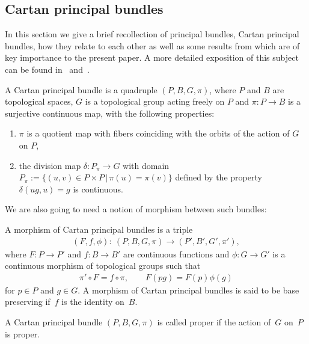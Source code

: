 \documentclass[pdftex]{sigma}
\begin{document}
\subsection{Cartan principal bundles}
In this section we give a brief recollection of principal bundles, Cartan principal bundles, how they relate to each other as well as some results from \cite{P} which are of key importance to the present paper. A more detailed exposition of this subject can be found in~\cite{McK1} and~\cite{P}.
\begin{defi} A Cartan principal bundle is a quadruple $(P,B,G,\pi)$, where $P$ and $B$ are topological spaces, $G$ is a topological group acting freely on $P$ and $\pi\colon P\rightarrow B$ is a surjective continuous map, with the following properties:
\begin{enumerate}\itemsep=0pt
\item[1)] $\pi$ is a quotient map with fibers coinciding with the orbits of the action of $G$ on $P$,
\item[2)] the division map $\delta\colon P_{\pi}\rightarrow G$ with domain $P_{\pi}:=\{(u,v)\in P\times P\, |\, \pi(u)=\pi(v)\}$ defined by the property $\delta(ug,u)=g$ is continuous.
\end{enumerate}
\end{defi}
We are also going to need a notion of morphism between such bundles:
\begin{defi}A morphism of Cartan principal bundles is a triple
\begin{gather*} (F,f,\phi)\colon \ (P,B,G,\pi)\rightarrow (P',B',G',\pi'),\end{gather*} where $F\colon P\rightarrow P'$ and $f\colon B\rightarrow B'$ are continuous functions and $\phi\colon G\rightarrow G'$ is a continuous morphism of topological groups such that
\begin{gather*}
\pi'\circ F=f\circ\pi, \qquad F(pg)=F(p)\phi(g)
\end{gather*}
for $p\in P$ and $g\in G$. A morphism of Cartan principal bundles is said to be base preserving if~$f$ is the identity on~$B$.
\end{defi}
\begin{defi} A Cartan principal bundle $(P,B,G,\pi)$ is called proper if the action of~$G$ on~$P$ is proper.
\end{defi}
\end{document}
